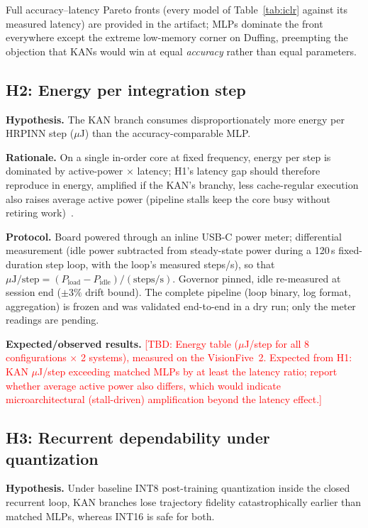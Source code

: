 \documentclass[conference]{IEEEtran}
\newcommand{\tbd}[1]{\textcolor{red}{[TBD: #1]}}
\begin{document}
Full accuracy--latency Pareto fronts (every model of Table~\ref{tab:iclr}
against its measured latency) are provided in the artifact; MLPs dominate the
front everywhere except the extreme low-memory corner on Duffing, preempting
the objection that KANs would win at equal \emph{accuracy} rather than equal
parameters.

\subsection{H2: Energy per integration step}
\label{sec:h2}

\textbf{Hypothesis.} The KAN branch consumes disproportionately more energy
per HRPINN step ($\mu$J) than the accuracy-comparable MLP.

\textbf{Rationale.} On a single in-order core at fixed frequency, energy per
step is dominated by active-power $\times$ latency; H1's latency gap should
therefore reproduce in energy, amplified if the KAN's branchy, less
cache-regular execution also raises average active power (pipeline stalls
keep the core busy without retiring work)~\cite{zhangHW_PLACEHOLDER}.

\textbf{Protocol.} Board powered through an inline USB-C power meter;
differential measurement (idle power subtracted from steady-state power during
a 120\,s fixed-duration step loop, with the loop's measured steps/s), so that
$\mu\mathrm{J/step} = (P_{\mathrm{load}}-P_{\mathrm{idle}})/(\mathrm{steps/s})$.
Governor pinned, idle re-measured at session end ($\pm3\%$ drift bound). The
complete pipeline (loop binary, log format, aggregation) is frozen and was
validated end-to-end in a dry run; only the meter readings are pending.

\textbf{Expected/observed results.} \tbd{Energy table ($\mu$J/step for all 8
configurations $\times$ 2 systems), measured on the VisionFive~2. Expected
from H1: KAN $\mu$J/step exceeding matched MLPs by at least the latency
ratio; report whether average active power also differs, which would indicate
microarchitectural (stall-driven) amplification beyond the latency effect.}

\subsection{H3: Recurrent dependability under quantization}
\label{sec:h3}

\textbf{Hypothesis.} Under baseline INT8 post-training quantization inside
the closed recurrent loop, KAN branches lose trajectory fidelity
catastrophically earlier than matched MLPs, whereas INT16 is safe for both.
\end{document}
